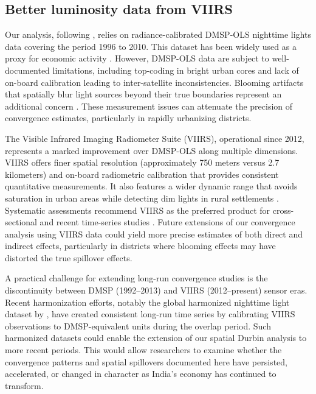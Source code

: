 \documentclass[
  a4paper, 
  twoside,
  review
]{article}
\begin{document}
\subsection{Better luminosity data from
VIIRS}\label{better-luminosity-data-from-viirs}

Our analysis, following \citet{chanda_kabiraj_district_convergence},
relies on radiance-calibrated DMSP-OLS nighttime lights data covering
the period 1996 to 2010. This dataset has been widely used as a proxy
for economic activity
\citep{henderson_storeygard_weil_lights, chen_nordhaus_luminosity_gdp}.
However, DMSP-OLS data are subject to well-documented limitations,
including top-coding in bright urban cores and lack of on-board
calibration leading to inter-satellite inconsistencies. Blooming
artifacts that spatially blur light sources beyond their true boundaries
represent an additional concern \citep{abrahams_etal_deblurring}. These
measurement issues can attenuate the precision of convergence estimates,
particularly in rapidly urbanizing districts.

The Visible Infrared Imaging Radiometer Suite (VIIRS), operational since
2012, represents a marked improvement over DMSP-OLS along multiple
dimensions. VIIRS offers finer spatial resolution (approximately 750
meters versus 2.7 kilometers) and on-board radiometric calibration that
provides consistent quantitative measurements. It also features a wider
dynamic range that avoids saturation in urban areas while detecting dim
lights in rural settlements \citep{elvidge_etal_viirs}. Systematic
assessments recommend VIIRS as the preferred product for cross-sectional
and recent time-series studies \citep{gibson_etal_ntl_measurement}.
Future extensions of our convergence analysis using VIIRS data could
yield more precise estimates of both direct and indirect effects,
particularly in districts where blooming effects may have distorted the
true spillover effects.

A practical challenge for extending long-run convergence studies is the
discontinuity between DMSP (1992--2013) and VIIRS (2012--present) sensor
eras. Recent harmonization efforts, notably the global harmonized
nighttime light dataset by \citet{li_etal_harmonization}, have created
consistent long-run time series by calibrating VIIRS observations to
DMSP-equivalent units during the overlap period. Such harmonized
datasets could enable the extension of our spatial Durbin analysis to
more recent periods. This would allow researchers to examine whether the
convergence patterns and spatial spillovers documented here have
persisted, accelerated, or changed in character as India's economy has
continued to transform.
\end{document}
